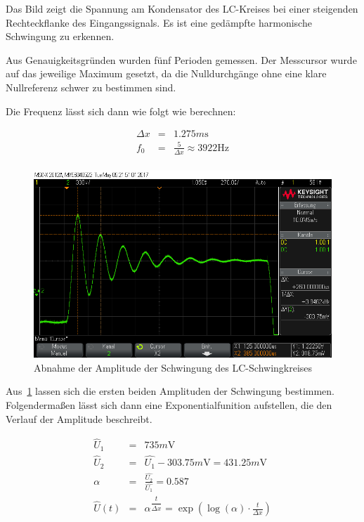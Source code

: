 \documentclass[10pt]{scrreprt}
\begin{document}
        Das Bild zeigt die Spannung am Kondensator des LC-Kreises bei einer
        steigenden Rechteckflanke des Eingangssignals.
        Es ist eine gedämpfte harmonische Schwingung zu erkennen.

        Aus Genauigkeitsgründen wurden fünf Perioden gemessen. Der Messcursor
        wurde auf das jeweilige Maximum gesetzt, da die Nulldurchgänge ohne eine
        klare Nullreferenz schwer zu bestimmen sind.

        Die Frequenz lässt sich dann wie folgt wie berechnen:
        \begin{center}
            \begin{eqnarray}
                \Delta x &=& 1.275 \si{m \second}\\
                f_0 &=& \frac{5}{\Delta x} \approx 3922\si{\hertz}\\
            \end{eqnarray}
            \begin{figure}[H]
                \includegraphics[width=\textwidth]{scope_13.png}
                \caption{Abnahme der Amplitude der Schwingung des LC-Schwingkreises}
                \label{fig:SpanAbn}
            \end{figure}
        \end{center}

        Aus~\ref{fig:SpanAbn} lassen sich die ersten beiden Amplituden der Schwingung
        bestimmen. Folgendermaßen lässt sich dann eine Exponentialfunition aufstellen,
        die den Verlauf der Amplitude beschreibt.

        \begin{eqnarray}
            \hat{U}_1 &=& 735\si{m\volt}\\
            \hat{U}_2 &=& \hat{U_1} - 303.75\si{m\volt} = 431.25\si{m\volt}\\
            \alpha &=& \frac{\hat{U_2}}{\hat{U_1}} = 0.587\\
            \hat{U}(t) &=& \alpha^{\dfrac{t}{\Delta x}} = \exp{(\log{(\alpha)} \cdot \frac{t}{\Delta x})}
        \end{eqnarray}
\end{document}
